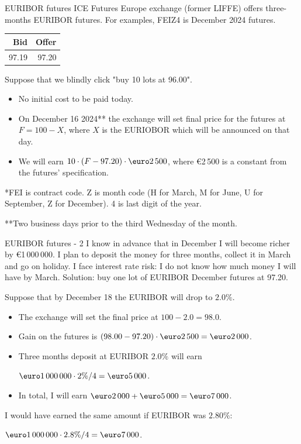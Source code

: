 \documentclass{beamer}
\renewcommand{\EUR}[1]{\textup{\euro}#1}
\begin{document}
\begin{frame}{EURIBOR futures}
\justify
ICE Futures Europe exchange (former LIFFE) offers three-months EURIBOR futures. For examples, \alert{FEIZ4} is December 2024 futures.

\justify
\centering
\begin{tabular}{r|r}
Bid & Offer \\ \hline
97.19 & 97.20
\end{tabular}

\justify
Suppose that we blindly click "buy 10 lots at 96.00".
\begin{itemize}
\justifying
\item No initial cost to be paid today.
\item On December 16 2024** the exchange will set final price for the futures at $F = 100 - X$, where 
$X$ is the EURIOBOR which will be announced on that day.
\item We will earn $10 \cdot (F - 97.20) \cdot \EUR{2\,500}$, where \EUR{2\,500} is a constant from the futures' specification.
\end{itemize}

\justify
*FEI is contract code. Z is month code (H for March, M for June, U for September, Z for December). 4 is last digit of the year.

\justify
**Two business days prior to the third Wednesday of the month.
\end{frame}



\begin{frame}{EURIBOR futures - 2}
\justify
I know in advance that in December I will become richer by \EUR{1\,000\,000}. I plan to deposit the money for three months, collect it in March and go on holiday. I face \alert{interest rate risk}: I do not know how  much money I will have by March.
\justify
Solution: buy one lot of EURIBOR December futures at 97.20.

\justify
Suppose that by December 18 the EURIBOR will drop to $2.0\%$.
\begin{itemize}
\justifying
\item The exchange will set the final price at $100 - 2.0 = 98.0$.
\item Gain on the futures is $(98.00-97.20)\cdot\EUR{2\,500} = \EUR{2\,000}$.
\item Three months deposit at EURIBOR $2.0\%$ will earn

$\EUR{1\,000\,000} \cdot 2\% / 4 = \EUR{5\,000}$.
\item In total, I will earn $\EUR{2\,000} + \EUR{5\,000} = \EUR{7\,000}$.
\end{itemize} 

\justify
I would have earned the same amount if EURIBOR was $2.80\%$:

$\EUR{1\,000\,000} \cdot 2.8\%/4 =\EUR{7\,000}$.
\end{frame}
\end{document}
